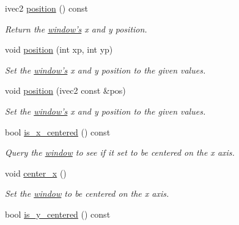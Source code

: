 \begin{DoxyCompactItemize}
ivec2 \hyperlink{classgfx_1_1window_a090720019f2da36382d0a947e2f71a36}{position} () const 
\begin{DoxyCompactList}\small\item\em Return the \hyperlink{classgfx_1_1window}{window's} x and y position. \end{DoxyCompactList}\item 
void \hyperlink{classgfx_1_1window_a1194cc211d3a9d3c8849ae10e0316a12}{position} (int xp, int yp)
\begin{DoxyCompactList}\small\item\em Set the \hyperlink{classgfx_1_1window}{window's} x and y position to the given values. \end{DoxyCompactList}\item 
void \hyperlink{classgfx_1_1window_a1c0ceb06e44800f44bf2de73fbc353f9}{position} (ivec2 const \&pos)
\begin{DoxyCompactList}\small\item\em Set the \hyperlink{classgfx_1_1window}{window's} x and y position to the given values. \end{DoxyCompactList}\item 
\hypertarget{classgfx_1_1window_a69968aebb6a2842953e11f2e51248942}{bool \hyperlink{classgfx_1_1window_a69968aebb6a2842953e11f2e51248942}{is\-\_\-x\-\_\-centered} () const }\label{classgfx_1_1window_a69968aebb6a2842953e11f2e51248942}

\begin{DoxyCompactList}\small\item\em Query the \hyperlink{classgfx_1_1window}{window} to see if it set to be centered on the x axis. \end{DoxyCompactList}\item 
void \hyperlink{classgfx_1_1window_afac08c0b3964c9adc133cbc9ceeea155}{center\-\_\-x} ()
\begin{DoxyCompactList}\small\item\em Set the \hyperlink{classgfx_1_1window}{window} to be centered on the x axis. \end{DoxyCompactList}\item 
\hypertarget{classgfx_1_1window_af87fdac7ff7411499b93ed2182ee6bc3}{bool \hyperlink{classgfx_1_1window_af87fdac7ff7411499b93ed2182ee6bc3}{is\-\_\-y\-\_\-centered} () const }\label{classgfx_1_1window_af87fdac7ff7411499b93ed2182ee6bc3}


\end{DoxyCompactItemize}
